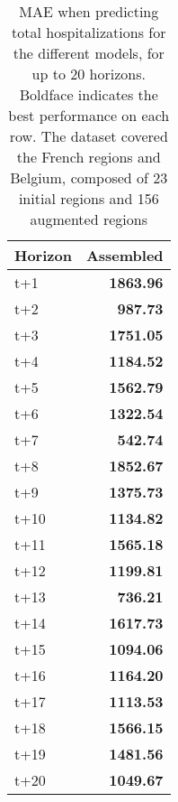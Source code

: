 \begin{table}[H]
\centering
\caption{MAE when predicting total hospitalizations for the different models, for up to 20 horizons. Boldface indicates the best performance on each row. The dataset covered the French regions and Belgium, composed of 23 initial regions and 156 augmented regions }
\label{tab:MAE_comparison}
\begin{tabular}{lr}
\toprule
Horizon &  Assembled \\
\midrule
t+1  & \textbf{1863.96}  \\
t+2  & \textbf{987.73}  \\
t+3  & \textbf{1751.05}  \\
t+4  & \textbf{1184.52}  \\
t+5  & \textbf{1562.79}  \\
t+6  & \textbf{1322.54}  \\
t+7  & \textbf{542.74}  \\
t+8  & \textbf{1852.67}  \\
t+9  & \textbf{1375.73}  \\
t+10  & \textbf{1134.82}  \\
t+11  & \textbf{1565.18}  \\
t+12  & \textbf{1199.81}  \\
t+13  & \textbf{736.21}  \\
t+14  & \textbf{1617.73}  \\
t+15  & \textbf{1094.06}  \\
t+16  & \textbf{1164.20}  \\
t+17  & \textbf{1113.53}  \\
t+18  & \textbf{1566.15}  \\
t+19  & \textbf{1481.56}  \\
t+20  & \textbf{1049.67}  \\

\bottomrule
\end{tabular}
\end{table}
